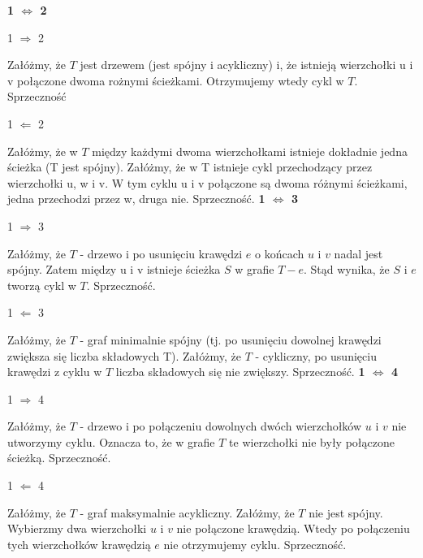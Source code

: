 \documentclass{mwart}
\begin{document}
\begin{mdframed}
    \textbf{1 $\Leftrightarrow$ 2}
    \item 1 $\Rightarrow$ 2 
    \item Załóżmy, że $T$ jest drzewem (jest spójny i acykliczny) i, że istnieją wierzchołki u i v połączone dwoma rożnymi ścieżkami. Otrzymujemy wtedy cykl w $T$. Sprzeczność \qedsymbol
    \item 1 $\Leftarrow$ 2
    \item Załóżmy, że w $T$ między każdymi dwoma wierzchołkami istnieje dokładnie jedna ścieżka (T jest spójny). Załóżmy, że w T istnieje cykl przechodzący przez wierzchołki 
            u, w i v. W tym cyklu u i v połączone są dwoma różnymi ścieżkami, jedna przechodzi przez w, druga nie. Sprzeczność.
            \qedsymbol
    \newline
    \newline
    \textbf{1 $\Leftrightarrow$ 3}
    \item 1 $\Rightarrow$ 3
    \item Załóżmy, że $T$ - drzewo i po usunięciu krawędzi $e$ o końcach $u$ i $v$ nadal jest spójny.
        Zatem między u i v istnieje ścieżka $S$ w grafie $T-e$. Stąd wynika, że $S$ i $e$ tworzą cykl w $T$. Sprzeczność. \qedsymbol
    \item 1 $\Leftarrow$ 3
    \item Załóżmy, że $T$ - graf minimalnie spójny (tj. po usunięciu dowolnej krawędzi zwiększa się liczba składowych T).
        Załóżmy, że $T$ - cykliczny, po usunięciu krawędzi z cyklu w $T$ liczba składowych się nie zwiększy. Sprzeczność.
        \qedsymbol
    \newline
    \newline
    \textbf{1 $\Leftrightarrow$ 4}
    \item 1 $\Rightarrow$ 4
    \item Załóżmy, że $T$ - drzewo i po połączeniu dowolnych dwóch wierzchołków $u$ i $v$ nie utworzymy cyklu. Oznacza to, że w grafie $T$ te wierzchołki nie były połączone ścieżką. Sprzeczność. \qedsymbol
    \item 1 $\Leftarrow$ 4
    \item Załóżmy, że $T$ - graf maksymalnie acykliczny. Załóżmy, że $T$ nie jest spójny. Wybierzmy dwa wierzchołki $u$ i $v$ nie połączone krawędzią. Wtedy po połączeniu tych wierzchołków krawędzią $e$ nie otrzymujemy cyklu. Sprzeczność. \qedsymbol
\end{mdframed}
\end{document}
